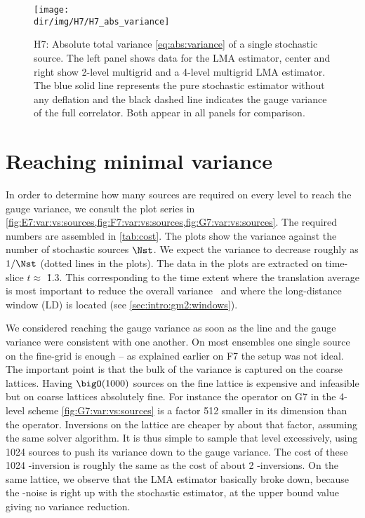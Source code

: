 \begin{figure}
\centering
\texttt{[image: \\dir/img/H7/H7\_abs\_variance]}
\caption{
H7: Absolute total variance \cref{eq:abs:variance} of a single stochastic source.
The left panel shows data for the LMA estimator, center and right show 2-level multigrid and a 4-level multigrid LMA estimator.
The blue solid line represents the pure stochastic estimator without any deflation and the black dashed line indicates the gauge variance of the full correlator. Both appear in all panels for comparison.
}
\label{fig:H7:abs:variance}
\end{figure}

\section{Reaching minimal variance}
\label{sec:numerics:reaching:gauge:variance}

In order to determine how many sources are required on every level to reach the gauge variance, we consult the plot series in \cref{fig:E7:var:vs:sources,fig:F7:var:vs:sources,fig:G7:var:vs:sources}.
The required numbers are assembled in \cref{tab:cost}.
The plots show the variance against the number of stochastic sources $\Nst$.
We expect the variance to decrease roughly as $1/\Nst$ (dotted lines in the plots).
The data in the plots are extracted on time-slice $t \approx $ \u{1.3}{\femto \metre}.
This corresponding to the time extent where the translation average is most important to reduce the overall variance~\cite{Kuberski_2023} and where the long-distance window (LD) is located (see \cref{sec:intro:gm2:windows}).

We considered reaching the gauge variance as soon as the line and the gauge variance were consistent with one another.
On most ensembles one single source on the fine-grid is enough -- as explained earlier on F7 the setup was not ideal.
The important point is that the bulk of the variance is captured on the coarse lattices.
Having $\bigO(1000)$ sources on the fine lattice is expensive and infeasible but on coarse lattices absolutely fine.
For instance the  operator on G7 in the 4-level scheme \cref{fig:G7:var:vs:sources} is a factor \num{512} smaller in its dimension than the  operator.
Inversions on the  lattice are cheaper by about that factor, assuming the same solver algorithm.
It is thus simple to sample that level excessively, using \num{1024} sources to push its variance down to the gauge variance.
The cost of these \num{1024} -inversion is roughly the same as the cost of about \num{2} -inversions.
On the same lattice, we observe that the LMA estimator basically broke down, because the -noise is right up with the stochastic estimator, \ie at the upper bound value giving no variance reduction.

